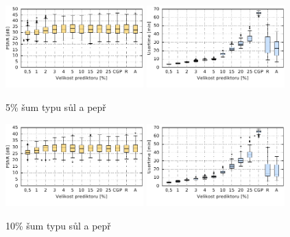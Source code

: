 \begin{figure}[H]
    \centering
    \includegraphics[width=0.475\textwidth]{fig/plot/compare/saltpepper5-100kg-psnrtest.pdf}
    \hskip0.5cm
    \includegraphics[width=0.475\textwidth]{fig/plot/compare/saltpepper5-100kg-usertime.pdf}
    \caption{5\% šum typu sůl a pepř}
\end{figure}

\begin{figure}[H]
    \centering
    \includegraphics[width=0.475\textwidth]{fig/plot/compare/saltpepper10-100kg-psnrtest.pdf}
    \hskip0.5cm
    \includegraphics[width=0.475\textwidth]{fig/plot/compare/saltpepper10-100kg-usertime.pdf}
    \caption{10\% šum typu sůl a pepř}
\end{figure}


